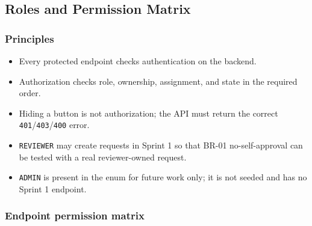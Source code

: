 \documentclass[11pt,a4paper]{article}
\begin{document}
\subsection{Roles and Permission Matrix}

\subsubsection{Principles}

\begin{itemize}[leftmargin=*,itemsep=2pt,topsep=2pt]
  \item Every protected endpoint checks authentication on the backend.
  \item Authorization checks role, ownership, assignment, and state in the required order.
  \item Hiding a button is not authorization; the API must return the correct \texttt{401}/\texttt{403}/\texttt{400} error.
  \item \texttt{REVIEWER} may create requests in Sprint 1 so that BR-01 no-self-approval can be tested with a real reviewer-owned request.
  \item \texttt{ADMIN} is present in the enum for future work only; it is not seeded and has no Sprint 1 endpoint.
\end{itemize}
\subsubsection{Endpoint permission matrix}
\end{document}
